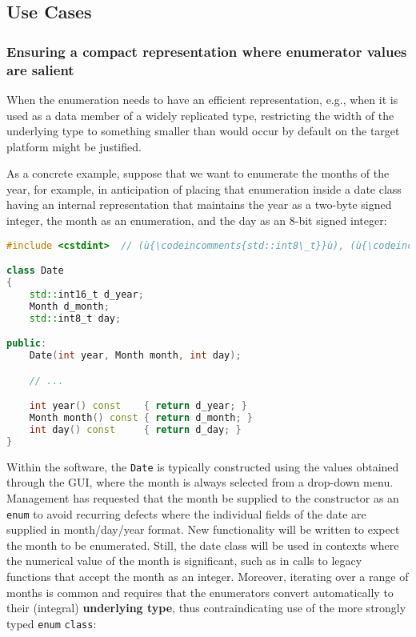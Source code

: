 \subsection[Use Cases]{Use Cases}\label{use-cases}

\subsubsection[Ensuring a compact representation where enumerator values are salient]{Ensuring a compact representation where enumerator values are salient}\label{ensuring-a-compact-representation-where-enumerator-values-are-salient}

When the enumeration needs to have an efficient representation, e.g.,
when it is used as a data member of a widely replicated type,
restricting the width of the underlying type to something smaller than
would occur by default on the target platform might be justified.

As a concrete example, suppose that we want to enumerate the months of
the year, for example, in anticipation of placing that enumeration
inside a date class having an internal representation that maintains the
year as a two-byte signed integer, the month as an enumeration, and the
day as an 8-bit signed integer:

\begin{lstlisting}[language=C++]
#include <cstdint>  // (ù{\codeincomments{std::int8\_t}}ù), (ù{\codeincomments{std::int16\_t}}ù)

class Date
{
    std::int16_t d_year;
    Month d_month;
    std::int8_t day;

public:
    Date(int year, Month month, int day);

    // ...

    int year() const    { return d_year; }
    Month month() const { return d_month; }
    int day() const     { return d_day; }
}
\end{lstlisting}

\noindent Within the software, the \texttt{Date} is typically constructed using
the values obtained through the GUI, where the month is always selected
from a drop-down menu. Management has requested that the month be
supplied to the constructor as an \texttt{enum} to avoid recurring
defects where the individual fields of the date are supplied in
month/day/year format. New functionality will be written to expect the
month to be enumerated. Still, the date class will be used in contexts
where the numerical value of the month is significant, such as in calls
to legacy functions that accept the month as an integer. Moreover,
iterating over a range of months is common and requires that the
enumerators convert automatically to their (integral) \textbf{underlying
type}, thus contraindicating use of the more strongly typed
\texttt{enum} \texttt{class}:

